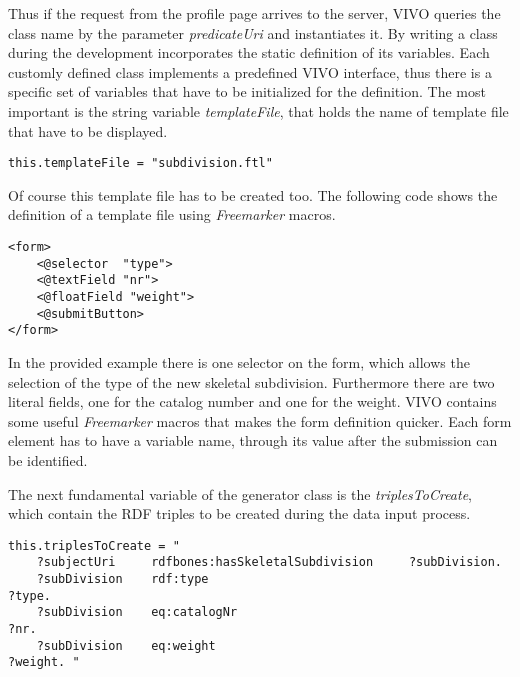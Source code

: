 Thus if the request from the profile page arrives to the server, VIVO queries the class name by the parameter \textit{predicateUri} and instantiates it. By writing a class during the development incorporates the static definition of its variables. Each customly defined class implements a predefined VIVO interface, thus there is a specific set of variables that have to be initialized for the definition. The most important is the string variable \textit{templateFile}, that holds the name of template file that have to be displayed.


\begin{lstlisting}[captionpos=b, caption= Form defintion in Java, label=skullJSON, belowskip=1em, aboveskip=2em,
basicstyle=\footnotesize,frame=single]
	this.templateFile = "subdivision.ftl"
\end{lstlisting}

Of course this template file has to be created too. The following code shows the definition of a template file using \textit{Freemarker} macros.

\begin{lstlisting}[captionpos=b, caption= subdivision.ftl, label=skullJSON, belowskip=1em, aboveskip=2em,
basicstyle=\footnotesize,frame=single]
<form>
	<@selector	"type">
	<@textField	"nr">
	<@floatField "weight">
	<@submitButton>
</form>	
\end{lstlisting}

In the provided example there is one selector on the form, which allows the selection of the type of the new skeletal subdivision. Furthermore there are two literal fields, one for the catalog number and one for the weight. VIVO contains some useful \textit{Freemarker} macros that makes the form definition quicker. Each form element has to have a variable name, through its value after the submission can be identified.
 
The next fundamental variable of the generator class is the \textit{triplesToCreate}, which contain the RDF triples to be created during the data input process. 

\begin{lstlisting}[captionpos=b, caption= RDF Triples to create, label=skullJSON, belowskip=1em, aboveskip=2em,
basicstyle=\footnotesize,frame=single]
this.triplesToCreate = "
	?subjectUri		rdfbones:hasSkeletalSubdivision		?subDivision.
	?subDivision	rdf:type													?type.
	?subDivision	eq:catalogNr											?nr.
	?subDivision	eq:weight													?weight. "
\end{lstlisting}


